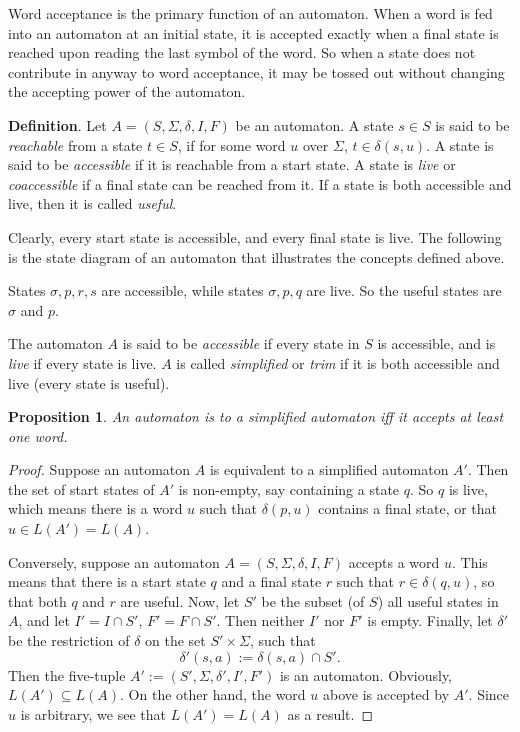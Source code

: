 \documentclass[12pt]{article}
\newtheorem{prop}{Proposition}
\begin{document}
Word acceptance is the primary function of an automaton.  When a word is fed into an automaton at an initial state, it is accepted exactly when a final state is reached upon reading the last symbol of the word.  So when a state does not contribute in anyway to word acceptance, it may be tossed out without changing the accepting power of the automaton.

\textbf{Definition}.  Let $A=(S,\Sigma,\delta,I,F)$ be an automaton.  A state $s\in S$ is said to be \emph{reachable} from a state $t\in S$, if for some word $u$ over $\Sigma$, $t\in \delta(s,u)$.  A state is said to be \emph{accessible} if it is reachable from a start state.  A state is \emph{live} or \emph{coaccessible} if a final state can be reached from it.  If a state is both accessible and live, then it is called \emph{useful}.

Clearly, every start state is accessible, and every final state is live.  The following is the state diagram of an automaton that illustrates the concepts defined above.

\begin{figure}[!h]
\centering
{}
\end{figure}

States $\sigma,p,r,s$ are accessible, while states $\sigma,p,q$ are live.  So the useful states are $\sigma$ and $p$.

The automaton $A$ is said to be \emph{accessible} if every state in $S$ is accessible, and is \emph{live} if every state is live.  $A$ is called \emph{simplified} or \emph{trim} if it is both accessible and live (every state is useful).

\begin{prop} An automaton is  to a simplified automaton iff it accepts at least one word.  \end{prop}
\begin{proof}  Suppose an automaton $A$ is equivalent to a simplified automaton $A'$.  Then the set of start states of $A'$ is non-empty, say containing a state $q$.  So $q$ is live, which means there is a word $u$ such that $\delta(p,u)$ contains a final state, or that $u\in L(A')=L(A)$.

Conversely, suppose an automaton $A=(S,\Sigma,\delta,I,F)$ accepts a word $u$.  This means that there is a start state $q$ and a final state $r$ such that $r\in \delta(q,u)$, so that both $q$ and $r$ are useful.  Now, let $S'$ be the subset (of $S$) all useful states in $A$, and let $I'=I\cap S'$, $F'=F\cap S'$.  Then neither $I'$ nor $F'$ is empty.  Finally, let $\delta'$ be the restriction of $\delta$ on the set $S'\times \Sigma$, such that $$\delta'(s,a) := \delta(s,a)\cap S'.$$  Then the five-tuple $A':=(S',\Sigma,\delta',I',F')$ is an automaton.  Obviously, $L(A')\subseteq L(A)$.  On the other hand, the word $u$ above is accepted by $A'$.  Since $u$ is arbitrary, we see that $L(A')=L(A)$ as a result.
\end{proof}
\end{document}
